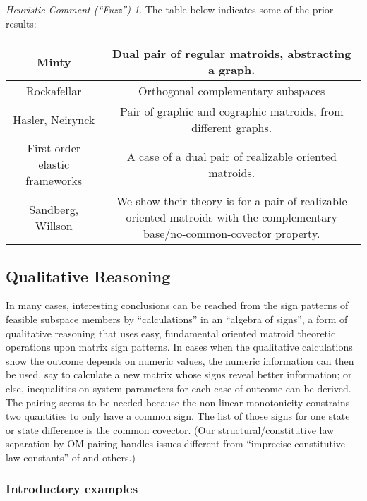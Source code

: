 \documentclass{amsproc-sunycstr}
\theoremstyle{plain}
\theoremstyle{definition}
\theoremstyle{remark}
\newtheorem{fuzz}{Heuristic Comment (``Fuzz'')}
\begin{document}
\begin{fuzz}
The table below indicates some of the prior results:\\
{\newcommand{\mypage}[1]{\begin{minipage}{3in}#1\end{minipage}}
\begin{tabular}{cc}
Minty\cite{} & 
\mypage{Dual pair of regular matroids, abstracting a graph.} \\ \hline
Rockafellar\cite{RockafellarConvProg} &
\mypage{Orthogonal complementary subspaces} \\ \hline
Hasler, Neirynck\cite{HaslerNeirynck,Fosseprez} & 
\mypage{Pair of graphic and cographic matroids, from 
different graphs.} \\ \hline
First-order elastic frameworks & 
\mypage{A case of a dual pair of realizable oriented matroids.}
\\ \hline
Sandberg, Willson\cite{SWExistancePf,SWExistanceSIAM} & 
\mypage{We show their theory is for a 
pair of realizable oriented matroids with the 
complementary base/no-common-covector property.}
\end{tabular}
}
\end{fuzz}

\subsection{Qualitative Reasoning}
In many cases, interesting conclusions can be reached
from the sign patterns of feasible subspace members by 
``calculations'' in an ``algebra of signs'', a 
form of qualitative reasoning that uses
easy, fundamental oriented matroid theoretic 
operations 
upon matrix sign patterns.  In cases when
the qualitative calculations show the outcome depends on numeric
values, the numeric information can then be used, say to 
calculate a new matrix
whose signs reveal better information;
or else, inequalities
on system parameters for each case of outcome can be derived.  
The pairing seems to be needed because
the non-linear monotonicity
constrains two quantities to only have a common
sign. The list of those signs for one state or state difference
is the common covector.  (Our structural/constitutive law
separation by OM pairing handles issues different from
``imprecise constitutive law constants'' of \cite{Murota} and others.)

\subsubsection{Introductory examples}
\end{document}
